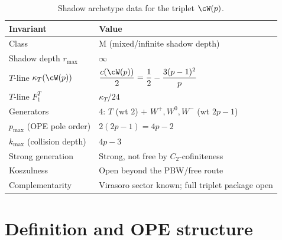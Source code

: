 \begin{table}[ht]
\centering
\small
\caption{Shadow archetype data for the triplet
$\cW(p)$.}\label{tab:wp-shadow-archetype}
\begin{tabular}{ll}
\toprule
\textbf{Invariant} & \textbf{Value} \\
\midrule
Class & M (mixed/infinite shadow depth) \\
Shadow depth $r_{\max}$ & $\infty$ \\
$T$-line $\kappa_T(\cW(p))$ &
 $\dfrac{c(\cW(p))}{2} = \dfrac{1}{2} - \dfrac{3(p-1)^2}{p}$ \\[4pt]
$T$-line $F_1^T$ & $\kappa_T / 24$ \\
Generators & $4$: \; $T$ (wt $2$) $+$ $W^+, W^0, W^-$ (wt $2p{-}1$) \\
$p_{\max}$ (OPE pole order) & $2(2p{-}1) = 4p - 2$ \\
$k_{\max}$ (collision depth) & $4p - 3$ \\
Strong generation & Strong, not free by $C_2$-cofiniteness \\
Koszulness & Open beyond the PBW/free route \\
Complementarity & Virasoro sector known; full triplet package open \\
\bottomrule
\end{tabular}
\end{table}


\section{Definition and OPE structure}\label{sec:wp-definition}

